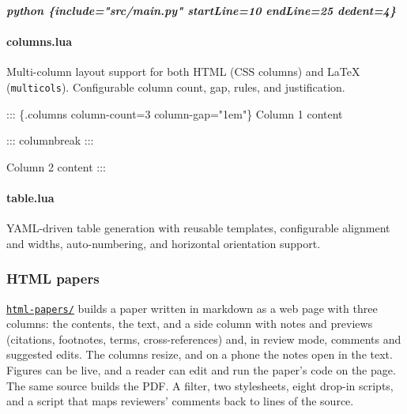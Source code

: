 \documentclass[
]{article}
\newenvironment{Shaded}{}{}
\newcommand{\InformationTok}[1]{\textcolor[rgb]{0.38,0.63,0.69}{\textbf{\textit{#1}}}}
\newcommand{\NormalTok}[1]{#1}
\begin{document}
\begin{Shaded}
\begin{Highlighting}[]
\InformationTok{\textasciigrave{}\textasciigrave{}\textasciigrave{}python \{include="src/main.py" startLine=10 endLine=25 dedent=4\}}
\InformationTok{\textasciigrave{}\textasciigrave{}\textasciigrave{}}
\end{Highlighting}
\end{Shaded}

\paragraph{columns.lua}\label{columns.lua}

Multi-column layout support for both HTML (CSS columns) and LaTeX
(\texttt{multicols}). Configurable column count, gap, rules, and
justification.

\begin{Shaded}
\begin{Highlighting}[]
\NormalTok{::: \{.columns column{-}count=3 column{-}gap="1em"\}}
\NormalTok{Column 1 content}

\NormalTok{::: columnbreak}
\NormalTok{:::}

\NormalTok{Column 2 content}
\NormalTok{:::}
\end{Highlighting}
\end{Shaded}

\paragraph{table.lua}\label{table.lua}

YAML-driven table generation with reusable templates, configurable
alignment and widths, auto-numbering, and horizontal orientation
support.

\subsubsection{HTML papers}\label{html-papers}

\href{html-papers/README.md}{\texttt{html-papers/}} builds a paper
written in markdown as a web page with three columns: the contents, the
text, and a side column with notes and previews (citations, footnotes,
terms, cross-references) and, in review mode, comments and suggested
edits. The columns resize, and on a phone the notes open in the text.
Figures can be live, and a reader can edit and run the paper's code on
the page. The same source builds the PDF. A filter, two stylesheets,
eight drop-in scripts, and a script that maps reviewers' comments back
to lines of the source.
\end{document}
